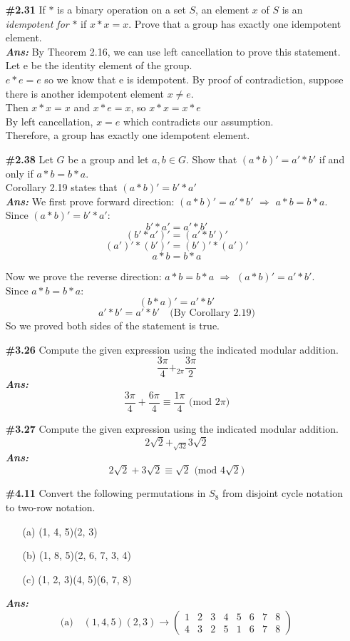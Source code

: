\documentclass[12pt]{article}
\newcommand{\sol}{\setlength{\parindent}{0cm}\textbf{\textit{Ans:}}\setlength{\parindent}{1cm} }
\begin{document}
\begin{enumerate}[start=1,label={\bfseries Question \arabic*:},leftmargin=1in]
  \item[\textbf{\#2.31}] 
  If $*$ is a binary operation on a set $S$, an element $x$ of $S$ is an \textit{idempotent for} $*$ if $x * x = x$. Prove that a group has exactly one idempotent element.\\
  \sol{} By Theorem 2.16, we can use left cancellation to prove this statement.\\
  Let e be the identity element of the group.\\
  $e*e=e$ so we know that e is idempotent.
  By proof of contradiction, suppose there is another idempotent element $x \neq e$.\\
  Then $x*x=x$ and $x*e=x$, so $x*x=x*e$\\
  By left cancellation, $x=e$ which contradicts our assumption.\\ 
  Therefore, a group has exactly one idempotent element.

  \item[\textbf{\#2.38}]
  Let $G$ be a group and let $a, b \in G$. Show that $(a * b)' = a' * b'$ if and only if $a * b = b * a$.\\
  Corollary 2.19 states that $(a * b)' = b' * a'$\\
  \sol{} We first prove forward direction: $(a * b)' = a' * b'$ $\Rightarrow$ $a * b = b * a$.\\
  Since $(a * b)' = b' * a'$:
  \[b' * a' = a' * b'\]
  \[(b' * a')' = (a' * b')'\]
  \[(a')' * (b')' = (b')' * (a')'\]
  \[a * b = b * a\]

  Now we prove the reverse direction: $a * b = b * a$ $\Rightarrow$ $(a * b)' = a' * b'$.\\
  Since $a * b = b * a$:
  \[(b*a)' = a'*b'\]
  \[a' * b' = a' * b' \quad \text{(By Corollary 2.19)}\]
  So we proved both sides of the statement is true.

  \item[\textbf{\#3.26}] 
  Compute the given expression using the indicated modular addition. 
  \[\frac{3\pi}{4} +_{2\pi} \frac{3\pi}{2}\]
  \sol{} 
  \[\frac{3\pi}{4} + \frac{6\pi}{4} \equiv  \frac{1\pi}{4} \text{ (mod } 2\pi)\]
  \item[\textbf{\#3.27}]  
  Compute the given expression using the indicated modular addition. 
  \[2\sqrt{2} +_{\sqrt{32}} 3\sqrt{2}\]
  \sol{} 
  \[2\sqrt{2} + 3\sqrt{2} \equiv  \sqrt{2} \text{ (mod } 4\sqrt{2})\]
  \item[\textbf{\#4.11}]
  Convert the following permutations in $S_8$ from disjoint cycle notation to two-row notation.
  \begin{enumerate}
      \item[(a)] (1, 4, 5)(2, 3)
      \item[(b)] (1, 8, 5)(2, 6, 7, 3, 4)
      \item[(c)] (1, 2, 3)(4, 5)(6, 7, 8)
  \end{enumerate}
  \sol{}
  \[
  \text{(a)} \quad (1, 4, 5)(2, 3) \rightarrow
  \begin{pmatrix}
  1 & 2 & 3 & 4 & 5 & 6 & 7 & 8 \\
  4 & 3 & 2 & 5 & 1 & 6 & 7 & 8
  \end{pmatrix}
  \]


\end{enumerate}
\end{document}
